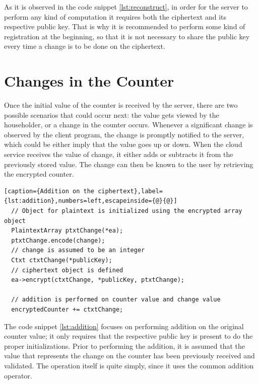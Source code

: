 As it is observed in the code snippet \ref{lst:reconstruct}, in order for the server to perform any kind of computation it requires both the ciphertext and its respective public key. That is why it is recommended to perform some kind of registration at the beginning, so that it is not necessary to share the public key every time a change is to be done on the ciphertext. 

\section{{Changes in the Counter}}

Once the initial value of the counter is received by the server, there are two possible scenarios that could occur next: the value gets viewed by the householder, or a change in the counter occurs. Whenever a significant change is observed by the client program, the change is promptly notified to the server, which could be either imply that the value goes up or down. When the cloud service receives the value of change, it either adds or subtracts it from the previously stored value. The change can then be known to the user by retrieving the encrypted counter.

\begin{lstlisting}[caption={Addition on the ciphertext},label={lst:addition},numbers=left,escapeinside={@}{@}]
  // Object for plaintext is initialized using the encrypted array object
  PlaintextArray ptxtChange(*ea);
  ptxtChange.encode(change); 
  // change is assumed to be an integer
  Ctxt ctxtChange(*publicKey); 
  // ciphertext object is defined 
  ea->encrypt(ctxtChange, *publicKey, ptxtChange);

  // addition is performed on counter value and change value
  encryptedCounter += ctxtChange;
\end{lstlisting}

The code snippet \ref{lst:addition} focuses on performing addition on the original counter value; it only requires that the respective public key is present to do the proper initializations. Prior to performing the addition, it is assumed that the value that represents the change on the counter has been previously received and validated. The operation itself is quite simply, since it uses the common addition operator. 

